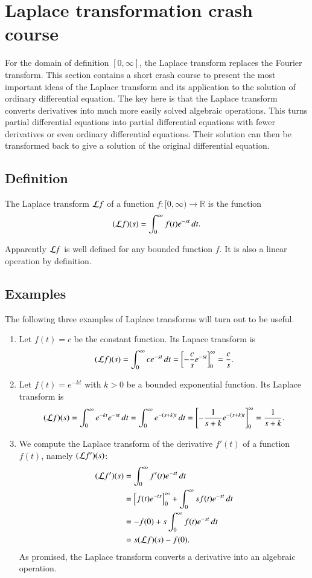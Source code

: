 %
%
%
\section{Laplace transformation crash course}
For the domain of definition $[0,\infty]$, the Laplace transform
replaces the Fourier transform.
This section contains a short crash course to present the most important
ideas of the Laplace transform and its application to the solution
of ordinary differential equation.
The key here is that the Laplace transform converts derivatives into
much more easily solved algebraic operations.
This turns partial differential equations into partial differential equations
with fewer derivatives or even ordinary differential equations.
Their solution can then be transformed back to give a solution of the
original differential equation.

\subsection{Definition}
\begin{definition}
The Laplace transform ${\cal L}f$ of a function
$f\colon[0,\infty)\to\mathbb R$ is the function
\[
({\cal L}f)(s)=\int_0^\infty f(t)e^{-st}\,dt.
\]
\end{definition}
Apparently ${\cal L}f$ is well defined for any bounded function $f$.
It is also a linear operation by definition.

\subsection{Examples}
The following three examples of Laplace transforms will turn out to
be useful.
\begin{enumerate}
\item
Let $f(t)=c$ be the constant function.
Its Lapace transform is
\[
({\cal L}f)(s)
=
\int_0^\infty ce^{-st}\,dt
=
\left[
-\frac{c}{s}e^{-st}
\right]_0^\infty=\frac{c}{s}.
\]

\item
Let $f(t)=e^{-kt}$ with $k>0$ be a bounded exponential function.
Its Laplace transform is
\[
({\cal L}f)(s)=\int_0^\infty e^{-kt}e^{-st}\,dt
=\int_0^{\infty}e^{-(s+k)t}\,dt
=
\left[
- \frac1{s+k}e^{-(s+k)t}
\right]_0^\infty
=\frac1{s+k}.
\]

\item
We compute the Laplace transform of the derivative $f'(t)$ of a function
$f(t)$, namely
$({\cal L}f')(s)$:
\begin{align*}
({\cal L}f')(s)
&=
\int_0^\infty f'(t)e^{-st}\,dt
\\
&=
\left[f(t)e^{-ts}\right]_0^\infty
+
\int_0^\infty sf(t)e^{-st}\,dt
\\
&=
-f(0)+s\int_0^\infty f(t)e^{-st}\,dt
\\
&=s({\cal L}f)(s)-f(0).
\end{align*}
As promised, the Laplace transform converts a derivative into an
algebraic operation.
\end{enumerate}

